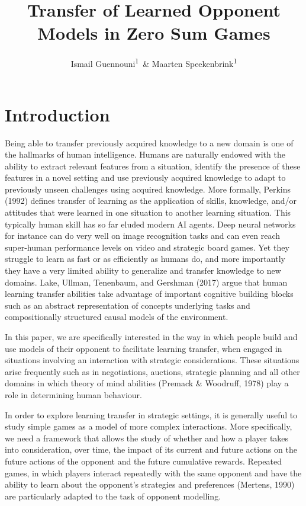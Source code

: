 \documentclass[man,floatsintext]{apa6}
\title{Transfer of Learned Opponent Models in Zero Sum Games}
\author{Ismail Guennouni\textsuperscript{1}~\& Maarten Speekenbrink\textsuperscript{1}}
\date{}
\begin{document}
\maketitle

\hypertarget{introduction}{%
\section{Introduction}\label{introduction}}

Being able to transfer previously acquired knowledge to a new domain is one of the hallmarks of human intelligence. Humans are naturally endowed with the ability to extract relevant features from a situation, identify the presence of these features in a novel setting and use previously acquired knowledge to adapt to previously unseen challenges using acquired knowledge. More formally, Perkins (1992) defines transfer of learning as the application of skills, knowledge, and/or attitudes that were learned in one situation to another learning situation. This typically human skill has so far eluded modern AI agents. Deep neural networks for instance can do very well on image recognition tasks and can even reach super-human performance levels on video and strategic board games. Yet they struggle to learn as fast or as efficiently as humans do, and more importantly they have a very limited ability to generalize and transfer knowledge to new domains. Lake, Ullman, Tenenbaum, and Gershman (2017) argue that human learning transfer abilities take advantage of important cognitive building blocks such as an abstract representation of concepts underlying tasks and compositionally structured causal models of the environment.

In this paper, we are specifically interested in the way in which people build and use models of their opponent to facilitate learning transfer, when engaged in situations involving an interaction with strategic considerations. These situations arise frequently such as in negotiations, auctions, strategic planning and all other domains in which theory of mind abilities (Premack \& Woodruff, 1978) play a role in determining human behaviour.

In order to explore learning transfer in strategic settings, it is generally useful to study simple games as a model of more complex interactions. More specifically, we need a framework that allows the study of whether and how a player takes into consideration, over time, the impact of its current and future actions on the future actions of the opponent and the future cumulative rewards. Repeated games, in which players interact repeatedly with the same opponent and have the ability to learn about the opponent's strategies and preferences (Mertens, 1990) are particularly adapted to the task of opponent modelling.
\end{document}
